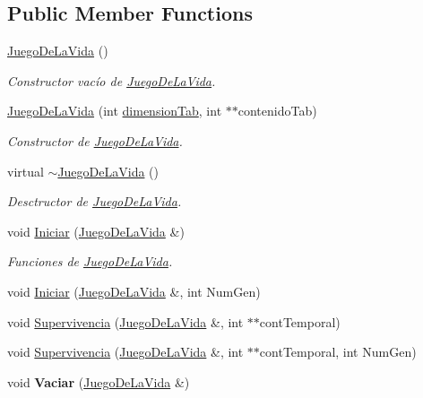 \subsection*{Public Member Functions}
\begin{DoxyCompactItemize}
\item 
\hypertarget{class_juego_de_la_vida_abdf075de6a4d6846add00de43e7d76ef}{\hyperlink{class_juego_de_la_vida_abdf075de6a4d6846add00de43e7d76ef}{Juego\+De\+La\+Vida} ()}\label{class_juego_de_la_vida_abdf075de6a4d6846add00de43e7d76ef}

\begin{DoxyCompactList}\small\item\em Constructor vacío de \hyperlink{class_juego_de_la_vida}{Juego\+De\+La\+Vida}. \end{DoxyCompactList}\item 
\hypertarget{class_juego_de_la_vida_a01b02de60c1f09ff38bcaf6c599eddaa}{\hyperlink{class_juego_de_la_vida_a01b02de60c1f09ff38bcaf6c599eddaa}{Juego\+De\+La\+Vida} (int \hyperlink{class_juego_de_la_vida_a1ed9d7c192843b0414ed8d0d221427bc}{dimension\+Tab}, int $\ast$$\ast$contenido\+Tab)}\label{class_juego_de_la_vida_a01b02de60c1f09ff38bcaf6c599eddaa}

\begin{DoxyCompactList}\small\item\em Constructor de \hyperlink{class_juego_de_la_vida}{Juego\+De\+La\+Vida}. \end{DoxyCompactList}\item 
virtual \hyperlink{class_juego_de_la_vida_af78ed62608dd32d4f7043ad45b599dc2}{$\sim$\+Juego\+De\+La\+Vida} ()
\begin{DoxyCompactList}\small\item\em Desctructor de \hyperlink{class_juego_de_la_vida}{Juego\+De\+La\+Vida}. \end{DoxyCompactList}\item 
void \hyperlink{class_juego_de_la_vida_a84dbec00b828b6102bb445f5103a1bed}{Iniciar} (\hyperlink{class_juego_de_la_vida}{Juego\+De\+La\+Vida} \&)
\begin{DoxyCompactList}\small\item\em Funciones de \hyperlink{class_juego_de_la_vida}{Juego\+De\+La\+Vida}. \end{DoxyCompactList}\item 
void \hyperlink{class_juego_de_la_vida_aeb29d8845eadc2de5cb12112c1fa1d59}{Iniciar} (\hyperlink{class_juego_de_la_vida}{Juego\+De\+La\+Vida} \&, int Num\+Gen)
\item 
void \hyperlink{class_juego_de_la_vida_adbfe5f4086c938071f99082ea5ee6039}{Supervivencia} (\hyperlink{class_juego_de_la_vida}{Juego\+De\+La\+Vida} \&, int $\ast$$\ast$cont\+Temporal)
\item 
void \hyperlink{class_juego_de_la_vida_a78b5f60ad9b7830ff3cba3f60dcf31b6}{Supervivencia} (\hyperlink{class_juego_de_la_vida}{Juego\+De\+La\+Vida} \&, int $\ast$$\ast$cont\+Temporal, int Num\+Gen)
\item 
\hypertarget{class_juego_de_la_vida_a4a55e27a01a746aa7a2da352dd2c82ca}{void {\bfseries Vaciar} (\hyperlink{class_juego_de_la_vida}{Juego\+De\+La\+Vida} \&)}\label{class_juego_de_la_vida_a4a55e27a01a746aa7a2da352dd2c82ca}


\end{DoxyCompactItemize}
